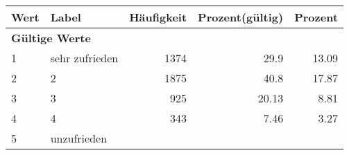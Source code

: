      \begin{longtable}{lXrrr}
     \toprule
     \textbf{Wert} & \textbf{Label} & \textbf{Häufigkeit} & \textbf{Prozent(gültig)} & \textbf{Prozent} \\
     \endhead
     \midrule
     \multicolumn{5}{l}{\textbf{Gültige Werte}}\\

     1 &
     \multicolumn{1}{X}{ sehr zufrieden   } &


       \num{1374} &
       \num[round-mode=places,round-precision=2]{29.9} &
         \num[round-mode=places,round-precision=2]{13.09} \\

     2 &
     \multicolumn{1}{X}{ 2   } &


       \num{1875} &
       \num[round-mode=places,round-precision=2]{40.8} &
         \num[round-mode=places,round-precision=2]{17.87} \\

     3 &
     \multicolumn{1}{X}{ 3   } &


       \num{925} &
       \num[round-mode=places,round-precision=2]{20.13} &
         \num[round-mode=places,round-precision=2]{8.81} \\

     4 &
     \multicolumn{1}{X}{ 4   } &


       \num{343} &
       \num[round-mode=places,round-precision=2]{7.46} &
         \num[round-mode=places,round-precision=2]{3.27} \\

     5 &
     \multicolumn{1}{X}{ unzufrieden   } &



\end{longtable}
